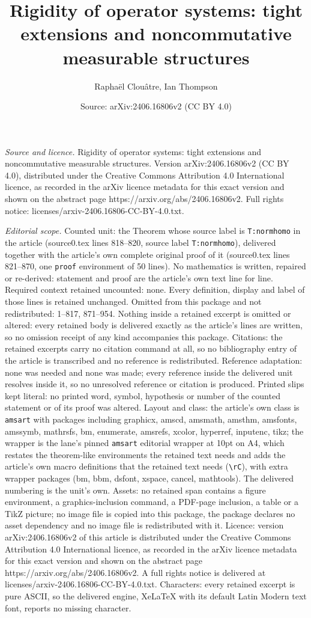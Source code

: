 \documentclass[10pt,a4paper]{amsart}
\title[Rigidity of operator systems: tight extensions and noncommut]{Rigidity of operator systems: tight extensions and noncommutative measurable structures}
\author{Rapha\"el Clou\^atre, Ian Thompson}
\date{Source: arXiv:2406.16806v2 (CC BY 4.0)}
\begin{document}
\maketitle

\noindent\emph{Source and licence.} Rigidity of operator systems: tight extensions and noncommutative measurable structures. Version arXiv:2406.16806v2 (CC BY 4.0), distributed under the Creative Commons Attribution 4.0 International licence, as recorded in the arXiv licence metadata for this exact version and shown on the abstract page https://arxiv.org/abs/2406.16806v2. Full rights notice: licenses/arxiv-2406.16806-CC-BY-4.0.txt.\par\smallskip

\noindent\textit{Editorial scope.} Counted unit: the Theorem whose source label is \texttt{T:normhomo} in the article (source0.tex lines 818--820, source label \texttt{T:normhomo}), delivered together with the article's own complete original proof of it (source0.tex lines 821--870, one \texttt{proof} environment of 50 lines). No mathematics is written, repaired or re-derived: statement and proof are the article's own text line for line. Required context retained uncounted: none. Every definition, display and label of those lines is retained unchanged. Omitted from this package and not redistributed: 1--817, 871--954. Nothing inside a retained excerpt is omitted or altered: every retained body is delivered exactly as the article's lines are written, so no omission receipt of any kind accompanies this package. Citations: the retained excerpts carry no citation command at all, so no bibliography entry of the article is transcribed and no reference is redistributed. Reference adaptation: none was needed and none was made; every reference inside the delivered unit resolves inside it, so no unresolved reference or citation is produced. Printed slips kept literal: no printed word, symbol, hypothesis or number of the counted statement or of its proof was altered. Layout and class: the article's own class is \texttt{amsart} with packages including graphicx, amscd, amsmath, amsthm, amsfonts, amssymb, mathrsfs, bm, enumerate, amsrefs, xcolor, hyperref, inputenc, tikz; the wrapper is the lane's pinned \texttt{amsart} editorial wrapper at 10pt on A4, which restates the theorem-like environments the retained text needs and adds the article's own macro definitions that the retained text needs (\texttt{\textbackslash rC}), with extra wrapper packages (bm, bbm, dsfont, xspace, cancel, mathtools). The delivered numbering is the unit's own. Assets: no retained span contains a figure environment, a graphics-inclusion command, a PDF-page inclusion, a table or a TikZ picture; no image file is copied into this package, the package declares no asset dependency and no image file is redistributed with it. Licence: version arXiv:2406.16806v2 of this article is distributed under the Creative Commons Attribution 4.0 International licence, as recorded in the arXiv licence metadata for this exact version and shown on the abstract page https://arxiv.org/abs/2406.16806v2. A full rights notice is delivered at licenses/arxiv-2406.16806-CC-BY-4.0.txt. Characters: every retained excerpt is pure ASCII, so the delivered engine, XeLaTeX with its default Latin Modern text font, reports no missing character.
\end{document}
